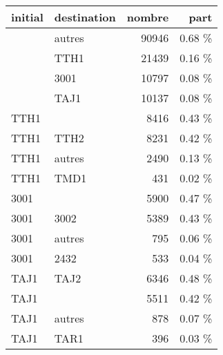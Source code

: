 \begin{tabular}{llrr}
\toprule
initial & destination &  nombre &   part \\
\midrule
        &      autres &   90946 & 0.68 \% \\
        &        TTH1 &   21439 & 0.16 \% \\
        &        3001 &   10797 & 0.08 \% \\
        &        TAJ1 &   10137 & 0.08 \% \\
   TTH1 &             &    8416 & 0.43 \% \\
   TTH1 &        TTH2 &    8231 & 0.42 \% \\
   TTH1 &      autres &    2490 & 0.13 \% \\
   TTH1 &        TMD1 &     431 & 0.02 \% \\
   3001 &             &    5900 & 0.47 \% \\
   3001 &        3002 &    5389 & 0.43 \% \\
   3001 &      autres &     795 & 0.06 \% \\
   3001 &        2432 &     533 & 0.04 \% \\
   TAJ1 &        TAJ2 &    6346 & 0.48 \% \\
   TAJ1 &             &    5511 & 0.42 \% \\
   TAJ1 &      autres &     878 & 0.07 \% \\
   TAJ1 &        TAR1 &     396 & 0.03 \% \\
\bottomrule
\end{tabular}
